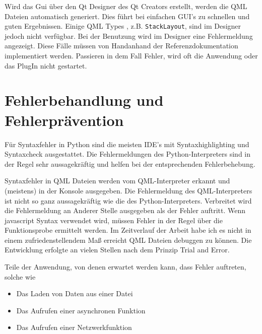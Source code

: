 \clearpage




Wird das Gui über den Qt Designer des Qt Creators erstellt, werden die QML Dateien automatisch generiert.
Dies führt bei einfachen GUI's zu schnellen und guten Ergebnissen. 
Einige QML Types , z.B. \verb|StackLayout|, sind im Designer jedoch nicht verfügbar. Bei der Benutzung wird im Designer eine Fehlermeldung angezeigt. 
Diese Fälle müssen \glq von Hand\grq anhand der Referenzdokumentation implementiert werden.
Passieren in dem Fall Fehler, wird oft die Anwendung oder das PlugIn nicht gestartet.

\section{Fehlerbehandlung und Fehlerprävention}

Für Syntaxfehler in Python sind die meisten IDE's mit Syntaxhighlighting und Syntaxcheck ausgestattet. 
Die Fehlermeldungen des Python-Interpreters sind in der Regel sehr aussagekräftig und helfen bei der entsprechenden Fehlerbehebung.

Syntaxfehler in QML Dateien werden vom QML-Interpreter erkannt und (meistens) in der Konsole ausgegeben.
Die Fehlermeldung des QML-Interpreters ist nicht so ganz aussagekräftig wie die des Python-Interpreters.
Verbreitet wird die Fehlermeldung an Anderer Stelle ausgegeben als der Fehler auftritt. 
Wenn javascript Syntax verwendet wird, müssen Fehler in der Regel über die Funktionsprobe ermittelt werden. 
Im Zeitverlauf der Arbeit habe ich es nicht in einem zufriedenstellendem Maß erreicht QML Dateien debuggen zu können. 
Die Entwicklung erfolgte an vielen Stellen nach dem Prinzip \grqq Trial and Error\grqq.

Teile der Anwendung, von denen erwartet werden kann, dass Fehler auftreten, solche wie
\begin{itemize}
    \item Das Laden von Daten aus einer Datei
    \item Das Aufrufen einer asynchronen Funktion
    \item Das Aufrufen einer Netzwerkfunktion
\end{itemize}


